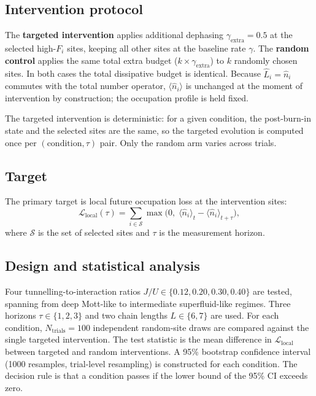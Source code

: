 \documentclass[11pt,a4paper]{article}
\newcommand{\Fi}{F_i}
\newcommand{\nop}{\hat{n}}
\newcommand{\Lop}{\hat{L}}
\begin{document}
\subsection{Intervention protocol}

The \textbf{targeted intervention} applies additional dephasing
$\gamma_{\mathrm{extra}}=0.5$ at the selected high-$\Fi$ sites, keeping
all other sites at the baseline rate $\gamma$.
The \textbf{random control} applies the same total extra budget
($k\times\gamma_{\mathrm{extra}}$) to $k$ randomly chosen sites.
In both cases the total dissipative budget is identical.
Because $\Lop_i=\nop_i$ commutes with the total number operator,
$\langle\nop_i\rangle$ is unchanged at the moment of intervention by
construction; the occupation profile is held fixed.

The targeted intervention is deterministic: for a given condition, the
post-burn-in state and the selected sites are the same, so the targeted
evolution is computed once per $(\text{condition},\tau)$ pair.
Only the random arm varies across trials.

\subsection{Target}

The primary target is local future occupation loss at the intervention
sites:
\begin{equation}
\label{eq:target}
\mathcal{L}_{\mathrm{local}}(\tau) =
  \sum_{i\in\mathcal{S}}
  \max\bigl(0,\;\langle\nop_i\rangle_t - \langle\nop_i\rangle_{t+\tau}\bigr),
\end{equation}
where $\mathcal{S}$ is the set of selected sites and $\tau$ is the
measurement horizon.

\subsection{Design and statistical analysis}

Four tunnelling-to-interaction ratios $J/U\in\{0.12,0.20,0.30,0.40\}$ are
tested, spanning from deep Mott-like to intermediate superfluid-like
regimes.
Three horizons $\tau\in\{1,2,3\}$ and two chain lengths $L\in\{6,7\}$
are used.
For each condition, $N_{\mathrm{trials}}=100$ independent random-site draws
are compared against the single targeted intervention.
The test statistic is the mean difference in $\mathcal{L}_{\mathrm{local}}$
between targeted and random interventions.
A 95\% bootstrap confidence interval (1000 resamples, trial-level
resampling) is constructed for each condition.
The decision rule is that a condition passes if the lower bound of the
95\% CI exceeds zero.
\end{document}
